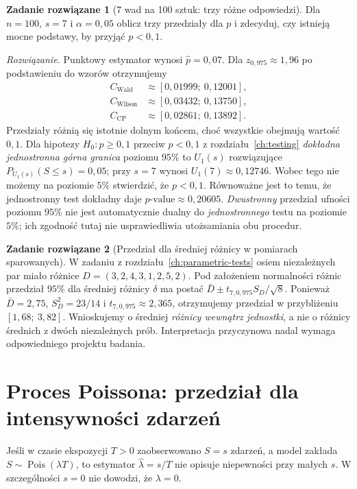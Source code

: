 \documentclass[11pt,a4paper,oneside]{report}
\numberwithin{equation}{chapter}
\theoremstyle{plain}
\theoremstyle{definition}
\newtheorem{zadanie}{Zadanie rozwiązane}[chapter]
\theoremstyle{remark}
\DeclareMathOperator{\Pois}{Pois}
\begin{document}
\begin{zadanie}[7 wad na 100 sztuk: trzy różne odpowiedzi]
\label{zad:ci-seven}
Dla $n=100$, $s=7$ i $\alpha=0{,}05$ oblicz trzy
przedziały dla $p$ i zdecyduj, czy istnieją mocne podstawy,
by przyjąć $p<0{,}1$.
\par\emph{Rozwiązanie.} Punktowy estymator wynosi
$\widehat p=0{,}07$. Dla $z_{0{,}975}\approx1{,}96$
po podstawieniu do wzorów otrzymujemy
\[
 \begin{aligned}
 C_{\mathrm{Wald}}&\approx[0{,}01999;\ 0{,}12001],\\
 C_{\mathrm{Wilson}}&\approx[0{,}03432;\ 0{,}13750],\\
 C_{\mathrm{CP}}&\approx[0{,}02861;\ 0{,}13892].
 \end{aligned}
\]
Przedziały różnią się istotnie dolnym końcem, choć
wszystkie obejmują wartość $0{,}1$. Dla hipotezy
$H_0:p\ge0{,}1$ przeciw $p<0{,}1$ z rozdziału~\ref{ch:testing}
\emph{dokładna jednostronna górna granica} poziomu $95\%$
to $U_1(s)$ rozwiązujące
$P_{U_1(s)}(S\le s)=0{,}05$; przy $s=7$
wynosi $U_1(7)\approx0{,}12746$. Wobec tego
nie możemy na poziomie $5\%$ stwierdzić, że
$p<0{,}1$. Równoważne jest to temu, że jednostronny
test dokładny daje $p\text{-value}\approx0{,}20605$.
\emph{Dwustronny} przedział ufności poziomu $95\%$
nie jest automatycznie dualny do \emph{jednostronnego}
testu na poziomie $5\%$; ich zgodność tutaj nie
usprawiedliwia utożsamiania obu procedur.
\end{zadanie}

\begin{zadanie}[Przedział dla średniej różnicy w pomiarach sparowanych]
W zadaniu z rozdziału~\ref{ch:parametric-tests} osiem
niezależnych par miało różnice
$D=(3,2,4,3,1,2,5,2)$. Pod założeniem normalności
różnic przedział $95\%$ dla średniej różnicy $\delta$
ma postać $\bar D\pm t_{7,0{,}975}S_D/\sqrt8$.
Ponieważ $\bar D=2{,}75$, $S_D^2=23/14$ i
$t_{7,0{,}975}\approx2{,}365$, otrzymujemy
przedział w przybliżeniu $[1{,}68;\ 3{,}82]$.
Wnioskujemy o średniej \emph{różnicy wewnątrz jednostki},
a nie o różnicy średnich z dwóch niezależnych prób.
Interpretacja przyczynowa nadal wymaga odpowiedniego
projektu badania.
\end{zadanie}

\section{Proces Poissona: przedział dla intensywności zdarzeń}
Jeśli w czasie ekspozycji $T>0$ zaobserwowano $S=s$
zdarzeń, a model zakłada $S\sim\Pois(\lambda T)$,
to estymator $\widehat\lambda=s/T$ nie opisuje niepewności
przy małych $s$. W szczególności $s=0$ nie dowodzi,
że $\lambda=0$.
\end{document}
